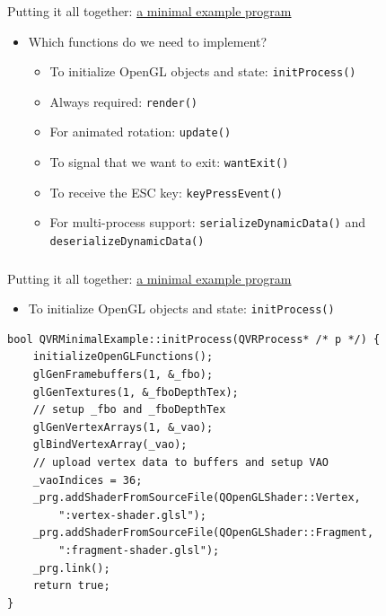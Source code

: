 \documentclass[utf8,stillsansserifmath,fleqn,t]{beamer}
\newcommand{\code}[1]{\texttt{#1}}
\begin{document}
\begin{frame}
\frametitle{\insertsection}
Putting it all together:
\href{https://git.marlam.de/gitweb/?p=qvr.git;a=tree;hb=HEAD;f=qvr-example-opengl-minimal}{a minimal example program}
\begin{itemize}
\item Which functions do we need to implement?
    \begin{itemize}
    \item To initialize OpenGL objects and state: \code{initProcess()}
    \item Always required: \code{render()}
    \item For animated rotation: \code{update()}
    \item To signal that we want to exit: \code{wantExit()}
    \item To receive the ESC key: \code{keyPressEvent()}
    \item For multi-process support: \code{serializeDynamicData()} and \code{deserializeDynamicData()}
    \end{itemize}
\end{itemize}
\end{frame}

\begin{frame}[fragile]
\frametitle{\insertsection}
Putting it all together:
\href{https://git.marlam.de/gitweb/?p=qvr.git;a=tree;hb=HEAD;f=qvr-example-opengl-minimal}{a minimal example program}
\begin{itemize}
    \item To initialize OpenGL objects and state: \code{initProcess()}
\end{itemize}
{\small
\begin{lstlisting}
bool QVRMinimalExample::initProcess(QVRProcess* /* p */) {
    initializeOpenGLFunctions();
    glGenFramebuffers(1, &_fbo);
    glGenTextures(1, &_fboDepthTex);
    // setup _fbo and _fboDepthTex
    glGenVertexArrays(1, &_vao);
    glBindVertexArray(_vao);
    // upload vertex data to buffers and setup VAO
    _vaoIndices = 36;
    _prg.addShaderFromSourceFile(QOpenGLShader::Vertex,
        ":vertex-shader.glsl");
    _prg.addShaderFromSourceFile(QOpenGLShader::Fragment,
        ":fragment-shader.glsl");
    _prg.link();
    return true;
}
\end{lstlisting}
}
\end{frame}
\end{document}
